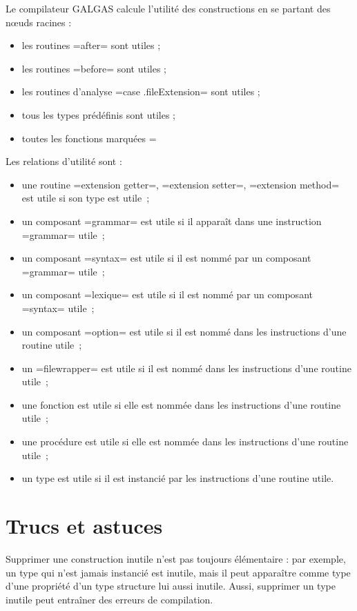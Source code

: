 Le compilateur GALGAS calcule l'utilité des constructions en se partant des nœuds racines :
\begin{itemize}
  \item les routines \ggst=after= sont utiles ;
  \item les routines \ggst=before= sont utiles ;
  \item les routines d'analyse \ggst=case .fileExtension= sont utiles ;
  \item tous les types prédéfinis sont utiles ;
  \item toutes les fonctions marquées \ggst=%
\end{itemize}

Les relations d'utilité sont :
\begin{itemize}
  \item une routine \ggst=extension getter=, \ggst=extension setter=, \ggst=extension method= est utile si son type est utile~;
  \item un composant \ggst=grammar= est utile si il apparaît dans une instruction \ggst=grammar= utile~;
  \item un composant \ggst=syntax= est utile si il est nommé par un composant \ggst=grammar= utile~;
  \item un composant \ggst=lexique= est utile si il est nommé par un composant \ggst=syntax= utile~;
  \item un composant \ggst=option= est utile si il est nommé dans les instructions d'une routine utile~;
  \item un  \ggst=filewrapper= est utile si il est nommé dans les instructions d'une routine utile~;
  \item une fonction est utile si elle est nommée dans les instructions d'une routine utile~;
  \item une procédure est utile si elle est nommée dans les instructions d'une routine utile~;
  \item un type est utile si il est instancié par les instructions d'une routine utile.
\end{itemize}



\section{Trucs et astuces}

Supprimer une construction inutile n'est pas toujours élémentaire : par exemple, un type qui n'est jamais instancié est inutile, mais il peut apparaître comme type d'une propriété d'un type structure lui aussi inutile. Aussi, supprimer un type inutile peut entraîner des erreurs de compilation.

